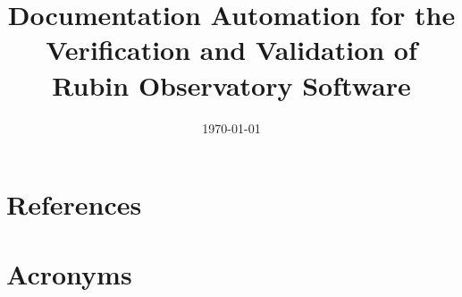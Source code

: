 \documentclass[]{spie}
\date{\today}
\title{Documentation Automation for the Verification and Validation of Rubin Observatory Software}
\begin{document}
\maketitle





\appendix

\section{References} \label{sec:bib}
%



\section{Acronyms} \label{sec:acronyms}
%
\end{document}
